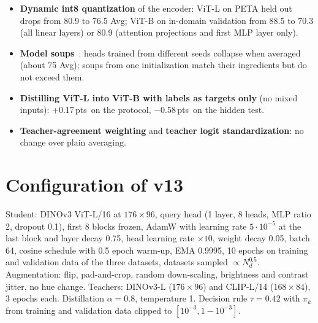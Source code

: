 \documentclass[10pt,twocolumn,letterpaper]{article}
\newcommand{\pts}{\,pts}
\begin{document}
\begin{itemize}
\item \textbf{Dynamic int8 quantization} of the encoder: ViT-L on PETA held out drops from 80.9 to 76.5 Avg; ViT-B on in-domain validation from 88.5 to 70.3 (all linear layers) or 80.9 (attention projections and first MLP layer only).
\item \textbf{Model soups}~\cite{soup}: heads trained from different seeds collapse when averaged (about 75 Avg); soups from one initialization match their ingredients but do not exceed them.
\item \textbf{Distilling ViT-L into ViT-B with labels as targets only} (no mixed inputs): +0.17\pts\ on the protocol, $-$0.58\pts\ on the hidden test.
\item \textbf{Teacher-agreement weighting} and \textbf{teacher logit standardization}: no change over plain averaging.
\end{itemize}

\section{Configuration of v13}

Student: DINOv3 ViT-L/16 at $176\times96$, query head (1 layer, 8 heads, MLP ratio 2, dropout 0.1), first 8 blocks frozen, AdamW with learning rate $5\cdot10^{-5}$ at the last block and layer decay 0.75, head learning rate $\times10$, weight decay 0.05, batch 64, cosine schedule with 0.5 epoch warm-up, EMA 0.9995, 10 epochs on training and validation data of the three datasets, datasets sampled $\propto N_d^{0.5}$. Augmentation: flip, pad-and-crop, random down-scaling, brightness and contrast jitter, no hue change. Teachers: DINOv3-L ($176\times96$) and CLIP-L/14 ($168\times84$), 3 epochs each. Distillation $\alpha=0.8$, temperature 1. Decision rule $\tau=0.42$ with $\pi_k$ from training and validation data clipped to $[10^{-3},1-10^{-3}]$.
\end{document}
